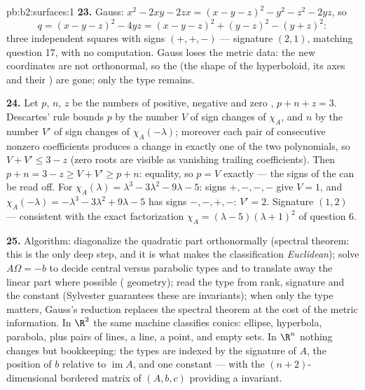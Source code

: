\begin{solution}{pb:b2:surfaces:1}
\textbf{23.} Gauss: $x^2 - 2xy - 2zx = (x - y - z)^2 - y^2 -
z^2 - 2yz$, so
\[
q = (x - y - z)^2 - 4yz = (x - y - z)^2 + (y - z)^2 - (y +
z)^2 :
\]
three independent squares with signs $(+, +, -)$ --- signature
$(2, 1)$, matching question 17, with no 
computation. Gauss loses the metric data: the new coordinates
are not orthonormal, so the  (the shape of the
hyperboloid, its axes and their ) are gone; only the
 type remains.

\textbf{24.} Let $p$, $n$, $z$ be the numbers of positive,
negative and zero , $p + n + z = 3$. Descartes'
rule bounds $p$ by the number $V$ of sign changes of
$\chi_A$, and $n$ by the number $V'$ of sign changes of
$\chi_A(-\lambda)$; moreover each pair of consecutive nonzero
coefficients produces a change in exactly one of the two
polynomials, so $V + V' \leq 3 - z$ (zero roots are visible
as vanishing trailing coefficients). Then $p + n = 3 - z \geq
V + V' \geq p + n$: equality, so $p = V$ exactly --- the
signs of the  can be read off. For $\chi_A(\lambda)
= \lambda^3 - 3\lambda^2 - 9\lambda - 5$: signs $+,-,-,-$
give $V = 1$, and $\chi_A(-\lambda) = -\lambda^3 - 3\lambda^2
+ 9\lambda - 5$ has signs $-,-,+,-$: $V' = 2$. Signature $(1,
2)$ --- consistent with the exact factorization $\chi_A =
(\lambda - 5)(\lambda + 1)^2$ of question 6.

\textbf{25.} Algorithm: diagonalize the quadratic part
orthonormally (spectral theorem: this is the only
 deep step, and it is what makes the
classification \emph{Euclidean}); solve $A\Omega = -b$ to
decide central versus parabolic types and to translate away
the linear part where possible ( geometry); read the
type from rank, signature and the constant (Sylvester
guarantees these are invariants); when only the  type
matters, Gauss's reduction replaces the spectral theorem at
the cost of the metric information. In $\R^2$ the same
machine classifies conics: ellipse, hyperbola, parabola, plus
pairs of lines, a line, a point, and empty sets. In $\R^n$
nothing changes but bookkeeping: the types are indexed by the
signature of $A$, the position of $b$ relative to
$\operatorname{im}A$, and one constant --- with the
$(n{+}2)$-dimensional bordered matrix of $(A, b, c)$
providing a  invariant.
\end{solution}
